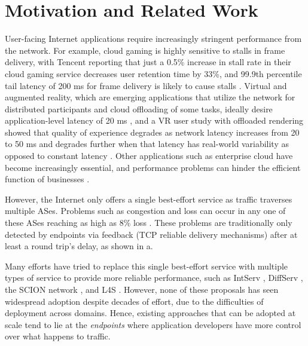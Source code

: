 \documentclass[sigconf,nonacm,screen,letterpaper,10pt]{acmart}
\begin{document}
\hypertarget{motivation-and-related-work}{%
\section{Motivation and Related
Work}\label{motivation-and-related-work}}

\label{sec:motivation-related-work} \label{sec:motivation}

User-facing Internet applications require increasingly stringent
performance from the network. For example, cloud gaming is highly
sensitive to stalls in frame delivery, with Tencent reporting that just
a 0.5\% increase in stall rate in their cloud gaming service decreases
user retention time by 33\%, and 99.9th percentile tail latency of 200
ms for frame delivery is likely to cause stalls \cite{augur}. Virtual
and augmented reality, which are emerging applications that utilize the
network for distributed participants and cloud offloading of some tasks,
ideally desire application-level latency of 20 ms
\cite{simulator-sickness-getmobile17}, and a VR user study with
offloaded rendering showed that quality of experience degrades as
network latency increases from 20 to 50 ms and degrades further when
that latency has real-world variability as opposed to constant latency
\cite{gao25xrgo}. Other applications such as enterprise cloud have
become increasingly essential, and performance problems can hinder the
efficient function of businesses \cite{painter}.

However, the Internet only offers a single best-effort service as
traffic traverses multiple ASes. Problems such as congestion and loss
can occur in any one of these ASes
\cite{akella-congestion, dhamdhere2018inferring} reaching as high as 8\%
loss \cite{silverpeak-loss-info}. These problems are traditionally only
detected by endpoints via feedback (\eg TCP reliable delivery
mechanisms) after at least a round trip's delay, as shown in
a.

Many efforts have tried to replace this single best-effort service with
multiple types of service to provide more reliable performance, such as
IntServ \cite{intserv-rfc}, DiffServ \cite{diffserv-rfc}, the SCION
network \cite{scion_deployment_conext}, and L4S \cite{l4s-rfc}. However,
none of these proposals has seen widespread adoption despite decades of
effort, due to the difficulties of deployment across domains. Hence,
existing approaches that can be adopted at scale tend to lie at the
\emph{endpoints} where application developers have more control over
what happens to traffic.
\end{document}
